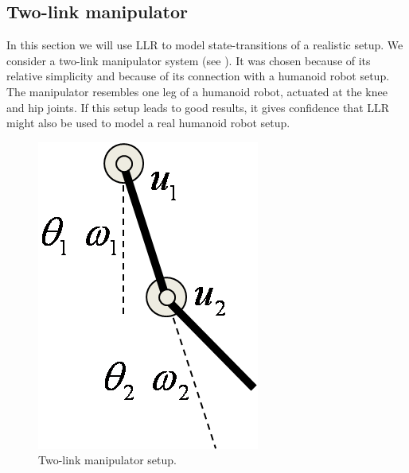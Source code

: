 \subsection{Two-link manipulator}\label{sec:LLR-two link manipulator}
In this section we will use \ac{LLR} to model state-transitions of a realistic setup. We consider a two-link manipulator system (see ). It was chosen because of its relative simplicity and because of its connection with a humanoid robot setup. The manipulator resembles one leg of a humanoid robot, actuated at the knee and hip joints. If this setup leads to good results, it gives confidence that \ac{LLR} might also be used to model a real humanoid robot setup.
\begin{figure}[htbp]
	\centering
		\includegraphics[width=.1\textwidth]{img/twolinkmanipulator}
	\caption[Two-link manipulator setup]{Two-link manipulator setup.}
	\label{fig:LLR-twolinkmanipulator}
\end{figure}

